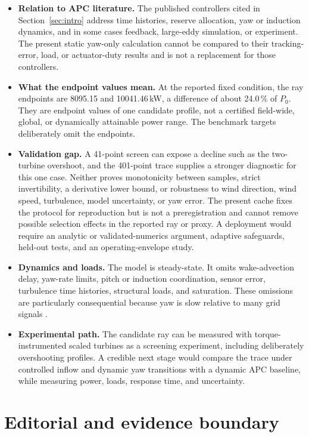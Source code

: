 \documentclass[wes, manuscript]{copernicus}
\begin{document}
\begin{itemize}
\item \textbf{Relation to APC literature.} The published controllers cited in Section~\ref{sec:intro} address time histories, reserve allocation, yaw or induction dynamics, and in some cases feedback, large-eddy simulation, or experiment. The present static yaw-only calculation cannot be compared to their tracking-error, load, or actuator-duty results and is not a replacement for those controllers.
\item \textbf{What the endpoint values mean.} At the reported fixed condition, the ray endpoints are 8095.15 and 10041.46\,kW, a difference of about 24.0\,\% of $P_0$. They are endpoint values of one candidate profile, not a certified field-wide, global, or dynamically attainable power range. The benchmark targets deliberately omit the endpoints.
\item \textbf{Validation gap.} A 41-point screen can expose a decline such as the two-turbine overshoot, and the 401-point trace supplies a stronger diagnostic for this one case. Neither proves monotonicity between samples, strict invertibility, a derivative lower bound, or robustness to wind direction, wind speed, turbulence, model uncertainty, or yaw error. The present cache fixes the protocol for reproduction but is not a preregistration and cannot remove possible selection effects in the reported ray or proxy. A deployment would require an analytic or validated-numerics argument, adaptive safeguards, held-out tests, and an operating-envelope study.
\item \textbf{Dynamics and loads.} The model is steady-state. It omits wake-advection delay, yaw-rate limits, pitch or induction coordination, sensor error, turbulence time histories, structural loads, and saturation. These omissions are particularly consequential because yaw is slow relative to many grid signals \citep{starke2023yawtracking,tamaro2026scaled}.
\item \textbf{Experimental path.} The candidate ray can be measured with torque-instrumented scaled turbines as a screening experiment, including deliberately overshooting profiles. A credible next stage would compare the trace under controlled inflow and dynamic yaw transitions with a dynamic APC baseline, while measuring power, loads, response time, and uncertainty.
\end{itemize}

\section{Editorial and evidence boundary}
\label{sec:editorial}
\end{document}
